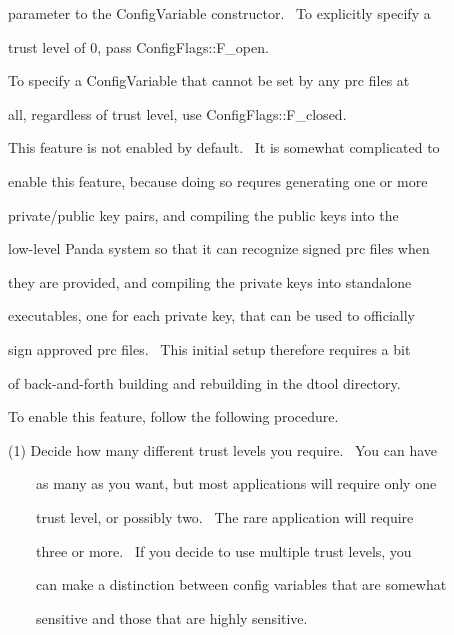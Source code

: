 \documentclass[a4paper]{article}
\begin{document}
{\color{black}
parameter to the ConfigVariable constructor. \ To explicitly specify a}

{\color{black}
trust level of 0, pass ConfigFlags::F\_open.}

\clearpage
\bigskip


\bigskip

{\color{black}
To specify a ConfigVariable that cannot be set by any prc files at}

{\color{black}
all, regardless of trust level, use ConfigFlags::F\_closed.}


\bigskip


\bigskip

{\color{black}
This feature is not enabled by default. \ It is somewhat complicated to}

{\color{black}
enable this feature, because doing so requres generating one or more}

{\color{black}
private/public key pairs, and compiling the public keys into the}

{\color{black}
low-level Panda system so that it can recognize signed prc files when}

{\color{black}
they are provided, and compiling the private keys into standalone}

{\color{black}
executables, one for each private key, that can be used to officially}

{\color{black}
sign approved prc files. \ This initial setup therefore requires a bit}

{\color{black}
of back-and-forth building and rebuilding in the dtool directory.}


\bigskip

{\color{black}
To enable this feature, follow the following procedure.}

{\color{black}
(1) Decide how many different trust levels you require. \ You can have}

{\color{black}
\ \ \ \ as many as you want, but most applications will require only one}

{\color{black}
\ \ \ \ trust level, or possibly two. \ The rare application will require}

{\color{black}
\ \ \ \ three or more. \ If you decide to use multiple trust levels, you}

{\color{black}
\ \ \ \ can make a distinction between config variables that are somewhat}

{\color{black}
\ \ \ \ sensitive and those that are highly sensitive.}
\end{document}
